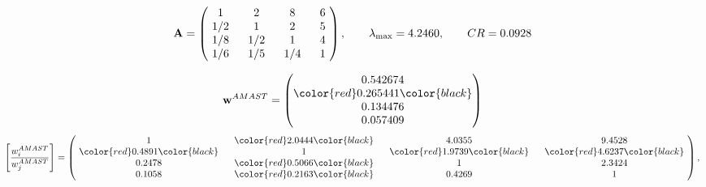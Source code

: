 \begin{example}
\begin{equation*}
\mathbf{A} =
\begin{pmatrix}
$\,\,$ 1 $\,\,$ & $\,\,$2$\,\,$ & $\,\,$8$\,\,$ & $\,\,$6 $\,\,$ \\
$\,\,$ 1/2$\,\,$ & $\,\,$ 1 $\,\,$ & $\,\,$2$\,\,$ & $\,\,$5 $\,\,$ \\
$\,\,$ 1/8$\,\,$ & $\,\,$ 1/2$\,\,$ & $\,\,$ 1 $\,\,$ & $\,\,$4 $\,\,$ \\
$\,\,$ 1/6$\,\,$ & $\,\,$ 1/5$\,\,$ & $\,\,$ 1/4$\,\,$ & $\,\,$ 1  $\,\,$ \\
\end{pmatrix},
\qquad
\lambda_{\max} =
4.2460,
\qquad
CR = 0.0928
\end{equation*}

\begin{equation*}
\mathbf{w}^{AMAST} =
\begin{pmatrix}
0.542674\\
\color{red} 0.265441\color{black} \\
0.134476\\
0.057409
\end{pmatrix}\end{equation*}
\begin{equation*}
\left[ \frac{{w}^{AMAST}_i}{{w}^{AMAST}_j} \right] =
\begin{pmatrix}
$\,\,$ 1 $\,\,$ & $\,\,$\color{red} 2.0444\color{black} $\,\,$ & $\,\,$4.0355$\,\,$ & $\,\,$9.4528$\,\,$ \\
$\,\,$\color{red} 0.4891\color{black} $\,\,$ & $\,\,$ 1 $\,\,$ & $\,\,$\color{red} 1.9739\color{black} $\,\,$ & $\,\,$\color{red} 4.6237\color{black}   $\,\,$ \\
$\,\,$0.2478$\,\,$ & $\,\,$\color{red} 0.5066\color{black} $\,\,$ & $\,\,$ 1 $\,\,$ & $\,\,$2.3424 $\,\,$ \\
$\,\,$0.1058$\,\,$ & $\,\,$\color{red} 0.2163\color{black} $\,\,$ & $\,\,$0.4269$\,\,$ & $\,\,$ 1  $\,\,$ \\
\end{pmatrix},
\end{equation*}


\end{example}
